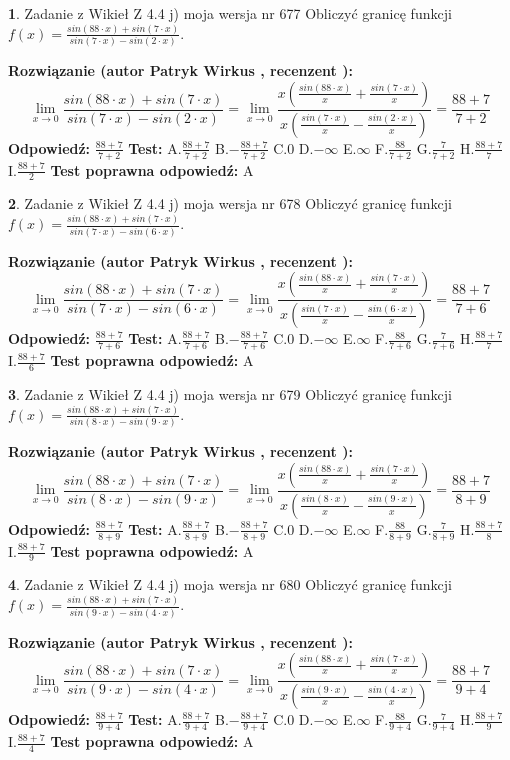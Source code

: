 \documentclass[12pt, a4paper]{article}
\theoremstyle{definition} %
\newtheorem{zad}{}
\newcommand{\zadStart}[1]{\begin{zad}#1\newline}
\newcommand{\zadStop}{\end{zad}}
\newcommand{\rozwStart}[2]{\noindent \textbf{Rozwiązanie (autor #1 , recenzent #2): }\newline}
\newcommand{\rozwStop}{\newline}
\newcommand{\odpStart}{\noindent \textbf{Odpowiedź:}\newline}
\newcommand{\odpStop}{\newline}
\newcommand{\testStart}{\noindent \textbf{Test:}\newline}
\newcommand{\testStop}{\newline}
\newcommand{\kluczStart}{\noindent \textbf{Test poprawna odpowiedź:}\newline}
\newcommand{\kluczStop}{\newline}
\begin{document}
\zadStart{Zadanie z Wikieł Z 4.4 j) moja wersja nr 677}
Obliczyć granicę funkcji $f(x)=\frac{sin(88\cdot x) +sin(7\cdot x)}{sin(7\cdot x) -sin(2\cdot x)}$.
\zadStop
\rozwStart{Patryk Wirkus}{}
$$\lim\limits_{x\to 0}\frac{sin(88\cdot x) +sin(7\cdot x)}{sin(7\cdot x) -sin(2\cdot x)}=\lim\limits_{x\to 0}\frac{x(\frac{sin(88\cdot x)}{x}+\frac{sin(7\cdot x)}{x})}{x(\frac{sin(7\cdot x)}{x}-\frac{sin(2\cdot x)}{x})}=\frac{88+7}{7+2}$$
\rozwStop
\odpStart
$\frac{88+7}{7+2}$
\odpStop
\testStart
A.$\frac{88+7}{7+2}$
B.$-\frac{88+7}{7+2}$
C.$0$
D.$-\infty$
E.$\infty$
F.$\frac{88}{7+2}$
G.$\frac{7}{7+2}$
H.$\frac{88+7}{7}$
I.$\frac{88+7}{2}$
\testStop
\kluczStart
A
\kluczStop



\zadStart{Zadanie z Wikieł Z 4.4 j) moja wersja nr 678}
Obliczyć granicę funkcji $f(x)=\frac{sin(88\cdot x) +sin(7\cdot x)}{sin(7\cdot x) -sin(6\cdot x)}$.
\zadStop
\rozwStart{Patryk Wirkus}{}
$$\lim\limits_{x\to 0}\frac{sin(88\cdot x) +sin(7\cdot x)}{sin(7\cdot x) -sin(6\cdot x)}=\lim\limits_{x\to 0}\frac{x(\frac{sin(88\cdot x)}{x}+\frac{sin(7\cdot x)}{x})}{x(\frac{sin(7\cdot x)}{x}-\frac{sin(6\cdot x)}{x})}=\frac{88+7}{7+6}$$
\rozwStop
\odpStart
$\frac{88+7}{7+6}$
\odpStop
\testStart
A.$\frac{88+7}{7+6}$
B.$-\frac{88+7}{7+6}$
C.$0$
D.$-\infty$
E.$\infty$
F.$\frac{88}{7+6}$
G.$\frac{7}{7+6}$
H.$\frac{88+7}{7}$
I.$\frac{88+7}{6}$
\testStop
\kluczStart
A
\kluczStop



\zadStart{Zadanie z Wikieł Z 4.4 j) moja wersja nr 679}
Obliczyć granicę funkcji $f(x)=\frac{sin(88\cdot x) +sin(7\cdot x)}{sin(8\cdot x) -sin(9\cdot x)}$.
\zadStop
\rozwStart{Patryk Wirkus}{}
$$\lim\limits_{x\to 0}\frac{sin(88\cdot x) +sin(7\cdot x)}{sin(8\cdot x) -sin(9\cdot x)}=\lim\limits_{x\to 0}\frac{x(\frac{sin(88\cdot x)}{x}+\frac{sin(7\cdot x)}{x})}{x(\frac{sin(8\cdot x)}{x}-\frac{sin(9\cdot x)}{x})}=\frac{88+7}{8+9}$$
\rozwStop
\odpStart
$\frac{88+7}{8+9}$
\odpStop
\testStart
A.$\frac{88+7}{8+9}$
B.$-\frac{88+7}{8+9}$
C.$0$
D.$-\infty$
E.$\infty$
F.$\frac{88}{8+9}$
G.$\frac{7}{8+9}$
H.$\frac{88+7}{8}$
I.$\frac{88+7}{9}$
\testStop
\kluczStart
A
\kluczStop



\zadStart{Zadanie z Wikieł Z 4.4 j) moja wersja nr 680}
Obliczyć granicę funkcji $f(x)=\frac{sin(88\cdot x) +sin(7\cdot x)}{sin(9\cdot x) -sin(4\cdot x)}$.
\zadStop
\rozwStart{Patryk Wirkus}{}
$$\lim\limits_{x\to 0}\frac{sin(88\cdot x) +sin(7\cdot x)}{sin(9\cdot x) -sin(4\cdot x)}=\lim\limits_{x\to 0}\frac{x(\frac{sin(88\cdot x)}{x}+\frac{sin(7\cdot x)}{x})}{x(\frac{sin(9\cdot x)}{x}-\frac{sin(4\cdot x)}{x})}=\frac{88+7}{9+4}$$
\rozwStop
\odpStart
$\frac{88+7}{9+4}$
\odpStop
\testStart
A.$\frac{88+7}{9+4}$
B.$-\frac{88+7}{9+4}$
C.$0$
D.$-\infty$
E.$\infty$
F.$\frac{88}{9+4}$
G.$\frac{7}{9+4}$
H.$\frac{88+7}{9}$
I.$\frac{88+7}{4}$
\testStop
\kluczStart
A
\kluczStop
\end{document}
